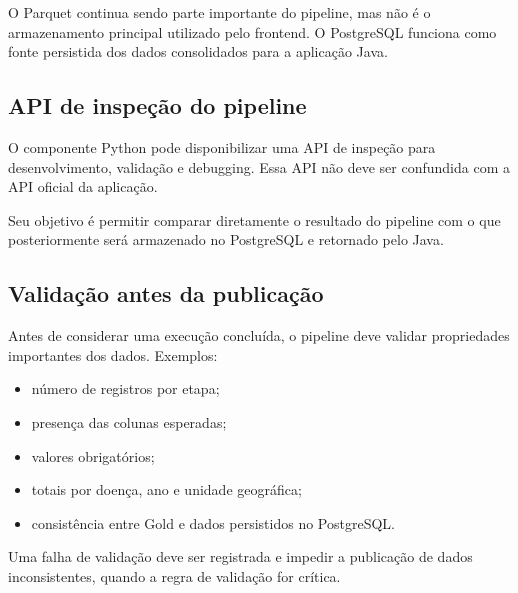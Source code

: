 \begin{explicacao}
O Parquet continua sendo parte importante do pipeline, mas não é o armazenamento principal utilizado pelo frontend. O PostgreSQL funciona como fonte persistida dos dados consolidados para a aplicação Java.
\end{explicacao}

\subsection{API de inspeção do pipeline}

O componente Python pode disponibilizar uma API de inspeção para desenvolvimento, validação e debugging. Essa API não deve ser confundida com a API oficial da aplicação.

Seu objetivo é permitir comparar diretamente o resultado do pipeline com o que posteriormente será armazenado no PostgreSQL e retornado pelo Java.

\subsection{Validação antes da publicação}

Antes de considerar uma execução concluída, o pipeline deve validar propriedades importantes dos dados. Exemplos:

\begin{itemize}
    \item número de registros por etapa;
    \item presença das colunas esperadas;
    \item valores obrigatórios;
    \item totais por doença, ano e unidade geográfica;
    \item consistência entre Gold e dados persistidos no PostgreSQL.
\end{itemize}

Uma falha de validação deve ser registrada e impedir a publicação de dados inconsistentes, quando a regra de validação for crítica.
